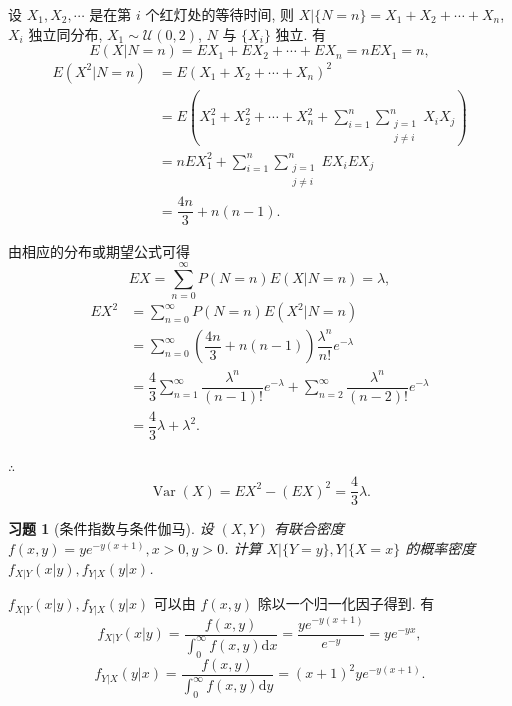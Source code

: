 \documentclass[UTF8,12pt,a4paper,fontset=fandol]{ctexart}
\newtheorem{exercise}{习题}[section]
\begin{document}
\begin{solve}\label{a:A6.4}
    设 $X_1,X_2,\cdots$ 是在第 $i$ 个红灯处的等待时间, 则 $X|\{N=n\}=X_1+X_2+\cdots+X_n$, $X_i$ 独立同分布, $X_1\sim\mathcal{U}(0,2)$, $N$ 与 $\{X_i\}$ 独立. 有
    \[E(X|N=n)=EX_1+EX_2+\cdots+EX_n=nEX_1=n,\]
    \begin{align*}
        E(X^2|N=n) & =E(X_1+X_2+\cdots+X_n)^2 \\
        & =E\left(X_1^2+X_2^2+\cdots+X_n^2+\sum\limits_{i=1}^n\sum\limits_{\substack{j=1\\j\neq i}}^nX_iX_j\right) \\
        & =nEX_1^2+\sum\limits_{i=1}^n\sum\limits_{\substack{j=1\\j\neq i}}^nEX_iEX_j \\
        & =\dfrac{4n}{3}+n(n-1).
    \end{align*}

    由相应的分布或期望公式可得
    \[EX=\sum\limits_{n=0}^\infty P(N=n)E(X|N=n)=\lambda,\]
    \begin{align*}
        EX^2 & =\sum\limits_{n=0}^\infty P(N=n)E(X^2|N=n) \\
        & =\sum\limits_{n=0}^\infty\left(\dfrac{4n}{3}+n(n-1)\right)\dfrac{\lambda^n}{n!}e^{-\lambda}  \\
        & =\dfrac{4}{3}\sum\limits_{n=1}^\infty\dfrac{\lambda^n}{(n-1)!}e^{-\lambda}+\sum\limits_{n=2}^\infty\dfrac{\lambda^n}{(n-2)!}e^{-\lambda}  \\
        & =\dfrac{4}{3}\lambda+\lambda^2.
    \end{align*}

    $\therefore$
    \[\operatorname{Var}(X)=EX^2-(EX)^2=\dfrac{4}{3}\lambda.\]
\end{solve}

\begin{exercise}[条件指数与条件伽马]\label{q:A6.9}
设 $(X,Y)$ 有联合密度 $f(x,y)=ye^{-y(x+1)},x>0,y>0$. 计算 $X|\{Y=y\},Y|\{X=x\}$ 的概率密度 $f_{X|Y}(x|y),f_{Y|X}(y|x)$.\par{}
\end{exercise}

\begin{solve}\label{a:A6.9}
    $f_{X|Y}(x|y),f_{Y|X}(y|x)$ 可以由 $f(x,y)$ 除以一个归一化因子得到. 有
    \[f_{X|Y}(x|y)=\dfrac{f(x,y)}{\int_0^\infty f(x,y)\mathrm{d}x}=\dfrac{ye^{-y(x+1)}}{e^{-y}}=ye^{-yx},\]
    \[f_{Y|X}(y|x)=\dfrac{f(x,y)}{\int_0^\infty f(x,y)\mathrm{d}y}=(x+1)^2ye^{-y(x+1)}.\]
\end{solve}
\end{document}

